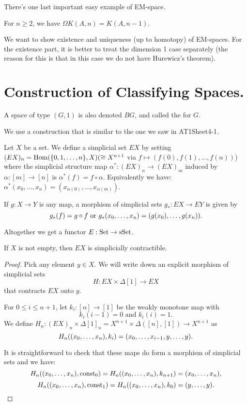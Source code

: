 

There's one last important easy example of EM-space.

\begin{example}
For $n\geq2$, we have $\Omega K(A,n)=K(A,n-1)$.
\end{example}

We want to show existence and uniqueness (up to homotopy) of EM-spaces. For the existence part, it is better to treat the dimension 1 case separately (the reason for this is that in this case we do not have Hurewicz's theorem).

\section{Construction of Classifying Spaces.}
\label{section:construction-of-classifying-spaces}

A space of type $(G,1)$ is also denoted $BG$, and called the  for $G$.

We use a construction that is similar to the one we saw in AT1Sheet4-1.

\begin{construction}
Let $X$ be a set. We define a simplicial set $EX$ by setting $(EX)_n=\operatorname{Hom}(\{0,1,\dots,n\},X)(\cong X^{n+1}$ via $f\mapsto(f(0),f(1),\dots,f(n))$) where the simplicial structure map $\alpha^*:(EX)_n\to(EX)_m$ induced by $\alpha:[m]\to[n]$ is $\alpha^*(f)=f\circ\alpha$. Equivalently we have: $\alpha^*(x_0,\dots,x_n)=(x_{\alpha(0)},\dots,x_{\alpha(m)})$.

If $g:X\to Y$ is any map, a morphism of simplicial sets $g_*:EX\to EY$ is given by
\[g_*(f)=g\circ f\text{ or }g_*({x_0,\dots,x_n})=(g(x_0),\dots,g(x_n)).\]

Altogether we get a functor $E:{\mathrm{Set}}\to{\mathrm{sSet}}$.
\end{construction}

\begin{proposition}
If $X$ is not empty, then $EX$ is simplicially contractible.
\end{proposition}

\begin{proof}
Pick any element $y\in X$. We will write down an explicit morphism of simplicial sets
\[H:EX\times\Delta[1]\to EX\]
that contracts $EX$ onto $y$.

For $0 \le i \le n+1$, let $k_i:[n]\to[1]$ be the weakly monotone map with
\[k_i(i-1)=0\text{ and }k_i(i)=1.\]
We define $H_n:(EX)_n\times\Delta[1]_n=X^{n+1}\times\Delta([n],[1])\to X^{n+1}$ as
\[H_n(({x_0,\dots,x_n}),k_i)=(x_0,\dots,x_{i-1},y,\dots,y).\]

It is straightforward to check that these maps do form a morphism of simplicial sets and we have:
\[H_n(({x_0,\dots,x_n}),\operatorname{const}_0)=H_n(({x_0,\dots,x_n}),k_{n+1})=({x_0,\dots,x_n}),\]
\[H_n(({x_0,\dots,x_n}),\operatorname{const}_1)=H_n(({x_0,\dots,x_n}),k_0)=(y,\dots,y).\]
\end{proof}


